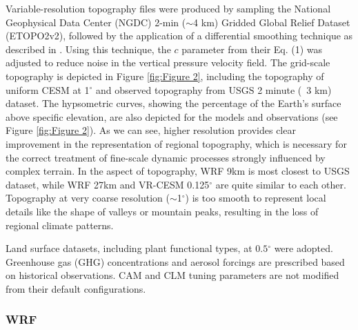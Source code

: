\documentclass[ms]{agutex}   %
\begin{document}
\begin{article}
Variable-resolution topography files were produced by sampling the National Geophysical Data Center (NGDC) 2-min ($\sim$4 km) Gridded Global Relief Dataset (ETOPO2v2), followed by the application of a differential smoothing technique as described in \cite{zarzycki2015effects}.  Using this technique, the $c$ parameter from their Eq. (1) was adjusted to reduce noise in the vertical pressure velocity field. The grid-scale topography is depicted in Figure \ref{fig:Figure 2}, including the topography of uniform CESM at 1$^\circ$ and observed topography from USGS 2 minute (~3 km) dataset. The hypsometric curves, showing the percentage of the Earth's surface above specific elevation, are also depicted for the models and observations (see Figure \ref{fig:Figure 2}). As we can see, higher resolution provides clear improvement in the representation of regional topography, which is necessary for the correct treatment of fine-scale dynamic processes strongly influenced by complex terrain. In the aspect of topography, WRF 9km is most closest to USGS dataset, while WRF 27km and VR-CESM 0.125$^\circ$ are quite similar to each other. Topography at very coarse resolution ($\sim$1$^\circ$) is too smooth to represent local details like the shape of valleys or mountain peaks, resulting in the loss of regional climate patterns.

Land surface datasets, including plant functional types, at $0.5$$^\circ$ were adopted. Greenhouse gas (GHG) concentrations and aerosol forcings are prescribed based on historical observations. CAM and CLM tuning parameters are not modified from their default configurations.


\subsubsection{WRF} 


\end{article}
\end{document}
